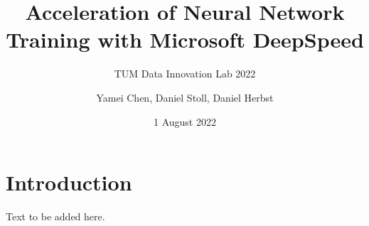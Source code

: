 \documentclass[12pt, aspectratio=169]{beamer}
\title{Acceleration of Neural Network Training with Microsoft DeepSpeed}
\subtitle{TUM Data Innovation Lab 2022}
\author{Yamei Chen, Daniel Stoll, Daniel Herbst}
\date{1 August 2022}
\begin{document}
	
	\begin{frame}[plain]
		\maketitle
	\end{frame}

	\begin{frame}
		\tableofcontents
	\end{frame}

	\section{Introduction}

	\begin{frame}
		Text to be added here.
		
	\end{frame}
\end{document}
